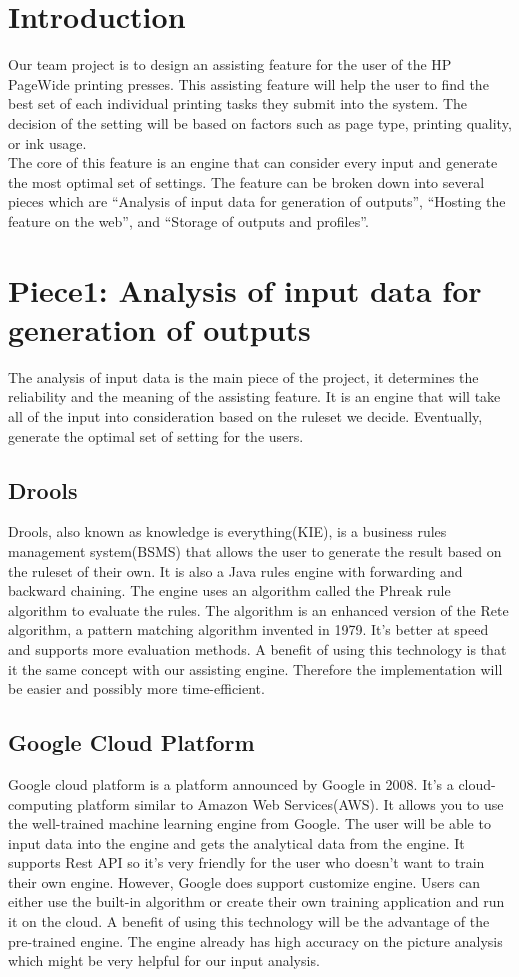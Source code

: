 \documentclass[onecolumn, draftclsnofoot,10pt, compsoc]{IEEEtran}
\begin{document}
\section{Introduction}
Our team project is to design an assisting feature for the user of the HP PageWide printing presses. This assisting feature will help the user to find the best set of each individual printing tasks they submit into the system. The decision of the setting will be based on factors such as page type, printing quality, or ink usage. \\
The core of this feature is an engine that can consider every input and generate the most optimal set of settings. The feature can be broken down into several pieces which are “Analysis of input data for generation of outputs”, “Hosting the feature on the web”, and “Storage of outputs and profiles”.\\

\section{Piece1: Analysis of input data for generation of outputs}
The analysis of input data is the main piece of the project, it determines the reliability and the meaning of the assisting feature. It is an engine that will take all of the input into consideration based on the ruleset we decide. Eventually, generate the optimal set of setting for the users.
\subsection{Drools}
Drools, also known as knowledge is everything(KIE), is a business rules management system(BSMS) that allows the user to generate the result based on the ruleset of their own. It is also a Java rules engine with forwarding and backward chaining. The engine uses an algorithm called the Phreak rule algorithm to evaluate the rules. The algorithm is an enhanced version of the Rete algorithm, a pattern matching algorithm invented in 1979. It’s better at speed and supports more evaluation methods.
A benefit of using this technology is that it the same concept with our assisting engine. Therefore the implementation will be easier and possibly more time-efficient.\cite{P1T1}

\subsection{Google Cloud Platform}
Google cloud platform is a platform announced by Google in 2008. It's a cloud-computing platform similar to Amazon Web Services(AWS). It allows you to use the well-trained machine learning engine from Google. The user will be able to input data into the engine and gets the analytical data from the engine. It supports Rest API so it’s very friendly for the user who doesn’t want to train their own engine. However, Google does support customize engine. Users can either use the built-in algorithm or create their own training application and run it on the cloud.
A benefit of using this technology will be the advantage of the pre-trained engine. The engine already has high accuracy on the picture analysis which might be very helpful for our input analysis.\cite{P1T2}
\end{document}

